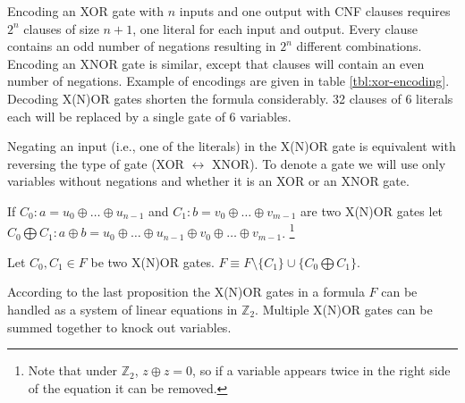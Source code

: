 Encoding an XOR gate with $n$ inputs and one output with CNF
clauses requires $2^n$ clauses of size $n + 1$, one literal for
each input and output.  Every clause contains an odd number of
negations resulting in $2^n$ different combinations. Encoding an
XNOR gate is similar, except that clauses will contain an even
number of negations.  Example of encodings are given in table
\ref{tbl:xor-encoding}.  Decoding X(N)OR gates shorten the formula
considerably. 32 clauses of 6 literals each will be replaced by a
single gate of 6 variables.

Negating an input (i.e., one of the literals) in the X(N)OR gate is
equivalent with reversing the type of gate (XOR $\leftrightarrow$
XNOR). To denote a gate we will use only variables without negations
and whether it is an XOR or an XNOR gate.


\begin{table}
  \centering

  \caption{Example of CNF encodings of XOR and XNOR gates}
  \label{tbl:xor-encoding}
\end{table}


\begin{mydef}
  \label{myprop:xor-sum}
  If $C_0: a = u_0 \oplus \ldots \oplus u_{n-1}$ and $C_1: b =
  v_0 \oplus \ldots \oplus v_{m-1}$ are two X(N)OR gates let $C_0
  \bigoplus C_1: a \oplus b = u_0 \oplus \ldots \oplus u_{n-1}
  \oplus v_0 \oplus \ldots \oplus v_{m-1}$. \footnote{Note that
  under $\mathbb{Z}_2$, $z \oplus z = 0$, so if a variable appears
  twice in the right side of the equation it can be removed.}
\end{mydef}

\begin{myprop}
  Let $C_0, C_1 \in F$ be two X(N)OR gates. $F \equiv F \setminus \{C_1\} \cup
  \{C_0 \bigoplus C_1\}$.
\end{myprop}

According to the last proposition the X(N)OR gates in a
formula $F$ can be handled as a system of linear equations in
$\mathbb{Z}_2$. Multiple X(N)OR gates can be summed together to
knock out variables.

